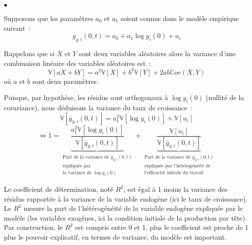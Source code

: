 \documentclass[10pt,notheorems]{beamer}
\theoremstyle{plain}
\theoremstyle{definition} %
\begin{document}
\begin{notes}

  \begin{list}{$\bullet$}{}


  \item Supposons que les paramètres $a_0$ et $a_1$ soient connus dans le modèle empirique suivant~:
    \[
      \bar g_{y,i}(0,t) = a_0 + a_1\log y_i(0) + u_i
    \]

  \item Rappelons que si $X$ et $Y$ sont deux variables aléatoires alors la variance d'une combinaison linéaire des variables aléatoires est~:
    \[
      \mathbb V [aX+bY] = a^ 2\mathbb V [X] + b^ 2\mathbb V [Y] + 2ab\mathbb Cov(X,Y)
    \]
    où $a$ et $b$ sont deux paramètres.\newline

  \item Puisque, par hypothèse, les résidus sont orthogonaux à $\log y_i(0)$ (nullité de la covariance), nous déduisons la variance du taux de croissance~:
    \[
      \mathbb V\left[\bar g_{y,i}(0,t)\right] = a_1^ 2\mathbb V \left[\log y_i(0)\right] + \mathbb V \left[u_i\right]
    \]
    \[
      \Leftrightarrow 1 =\underbrace{\frac{ a_1^ 2\mathbb V \left[\log y_i(0)\right]}{ \mathbb V\left[\bar g_{y,i}(0,t)\right]}}_{\substack{\text{Part de la variance de $\bar g_{y,i}(0,t)$}\\ \text{expliquée par}\\ \text{la variance de $\log y_i(0)$}}} + \underbrace{\frac{\mathbb V \left[u_i\right]}{\mathbb V\left[\bar g_{y,i}(0,t)\right] }}_{\substack{\text{Part de la variance de $\bar g_{y,i}(0,t)$}\\ \text{expliquée par l'hétérogénéité de}\\ \text{l'efficacité initiale du travail}}}
    \]

  \item Le coefficient de détermination, noté $R^ 2$, est égal à 1 moins la
    variance des résidus rapportée à la variance de la variable endogène (ici le
    taux de croissance). Le $R^ 2$ mesure la part de l'hétérogénéité de la
    variable endogène expliquée par le modèle (les variables exogènes, ici la
    condition initiale de la production par tête). Par construction, le $R^ 2$
    est compris entre 0 et 1, plus le coefficient est proche de 1 plus le
    pouvoir explicatif, en termes de variance, du modèle est important.\newline


\end{list}
\end{notes}
\end{document}
